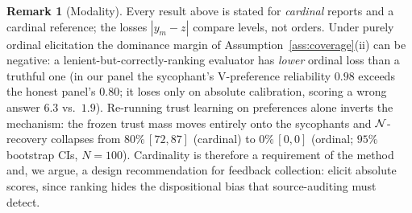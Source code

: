 \documentclass[11pt]{article}
\theoremstyle{definition}\newtheorem{definition}{Definition}
\theoremstyle{definition}\newtheorem{assumption}{Assumption}
\newtheorem{remark}{Remark}
\begin{document}
\begin{remark}[Modality]\label{rem:cardinal}
Every result above is stated for \emph{cardinal} reports and a cardinal
reference; the losses $|y_m-z|$ compare levels, not orders. Under purely ordinal
elicitation the dominance margin of Assumption~\ref{ass:coverage}(ii) can be
negative: a lenient-but-correctly-ranking evaluator has \emph{lower} ordinal loss
than a truthful one (in our panel the sycophant's V-preference reliability $0.98$
exceeds the honest panel's $0.80$; it loses only on absolute calibration, scoring a
wrong answer $6.3$ vs.\ $1.9$). Re-running trust learning on preferences alone
inverts the mechanism: the frozen trust mass moves entirely onto the sycophants and
$\mathcal{N}$-recovery collapses from $80\%\,[72,87]$ (cardinal) to $0\%\,[0,0]$ (ordinal;
$95\%$ bootstrap CIs, $N=100$). Cardinality is therefore a requirement of the method
and, we argue, a design recommendation for feedback collection: elicit absolute
scores, since ranking hides the dispositional bias that source-auditing must detect.
\end{remark}
\end{document}
